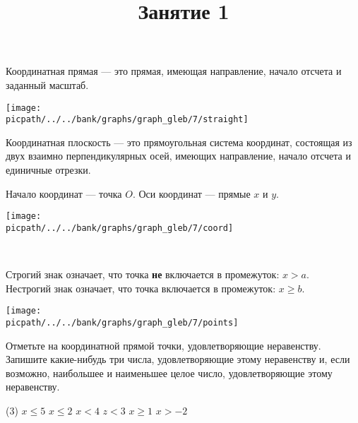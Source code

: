
\begin{class}[number=1-2]
	\title{Занятие 1}
	\begin{definit}
		Координатная прямая --- это прямая, имеющая направление, начало отсчета и заданный масштаб.
	\end{definit}
	\begin{minipage}[c]{0.9\linewidth}
		\texttt{[image: \\picpath/../../bank/graphs/graph\_gleb/7/straight]}
	\end{minipage}
	\begin{definit}
		Координатная плоскость --- это прямоугольная система координат, состоящая из двух взаимно перпендикулярных осей, имеющих направление, начало отсчета и единичные отрезки.
	\end{definit}
	\begin{definit}
		Начало координат --- точка \(O\).
		Оси координат --- прямые \(x\) и \(y\).
	\end{definit}
	\begin{minipage}[c]{0.5\linewidth}
		\texttt{[image: \\picpath/../../bank/graphs/graph\_gleb/7/coord]}
	\end{minipage}\\
	\begin{minipage}[c]{0.6\linewidth}
		\begin{definit}
			Строгий знак означает, что точка \textbf{не} включается в промежуток: \(x>a\). \\
			Нестрогий знак означает, что точка включается в промежуток: \(x\ge b\).
		\end{definit}
	\end{minipage}
	\begin{minipage}[c]{0.4\linewidth}
		\texttt{[image: \\picpath/../../bank/graphs/graph\_gleb/7/points]}
	\end{minipage}
	\begin{listofex}
		\item Отметьте на координатной прямой точки, удовлетворяющие неравенству. Запишите какие-нибудь три числа, удовлетворяющие этому неравенству и, если возможно, наибольшее и наименьшее целое число, удовлетворяющие этому неравенству.
		\begin{tasks}(3)
			\task \( x \le 5 \)
			\task \( x \le 2 \)
			\task \( x < 4 \)
			\task \( z<3 \)
			\task \( x \ge 1 \)
			\task \( x > -2 \)

\end{tasks}
\end{listofex}
\end{class}
